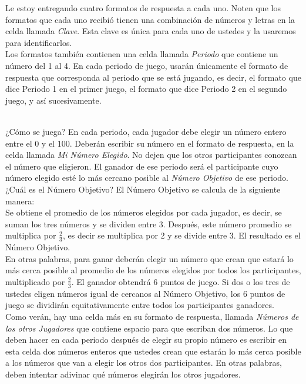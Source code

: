 Le estoy entregando cuatro formatos de respuesta a cada uno. Noten que los formatos que cada uno recibió tienen una combinación de números y letras en la celda llamada \textit{Clave}. Esta clave es única para cada uno de ustedes y la usaremos para identificarlos.\\

Los formatos también contienen una celda llamada \textit{Periodo} que contiene un número del 1 al 4. En cada periodo de juego, usarán únicamente el formato de respuesta que corresponda al periodo que se está jugando, es decir, el formato que dice Periodo 1 en el primer juego, el formato que dice Periodo 2 en el segundo juego, y así sucesivamente.\\\

¿Cómo se juega? En cada periodo, cada jugador debe elegir un número entero entre el 0 y el 100. Deberán escribir su número en el formato de respuesta, en la celda llamada \textit{Mi Número Elegido}. No dejen que los otros participantes conozcan el número que eligieron.
El ganador de ese periodo será el participante cuyo número elegido esté lo más cercano posible al \textit{Número Objetivo} de ese periodo. ¿Cuál es el Número Objetivo? El Número Objetivo se calcula de la siguiente manera:\\

Se obtiene el promedio de los números elegidos por cada jugador, es decir, se suman los tres números y se dividen entre 3. Después, este número promedio se multiplica por $\frac{2}{3}$, es decir se multiplica por 2 y se divide entre 3. El resultado es el Número Objetivo. \\

En otras palabras, para ganar deberán elegir un número que crean que estará lo más cerca posible al promedio de los números elegidos por todos los participantes, multiplicado por $\frac{2}{3}$. El ganador obtendrá 6 puntos de juego. Si dos o los tres de ustedes eligen números igual de cercanos al Número Objetivo, los 6 puntos de juego se dividirán equitativamente entre todos los participantes ganadores.\\

Como verán, hay una celda más en su formato de respuesta, llamada \textit{Números de los otros Jugadores} que contiene espacio para que escriban dos números. Lo que deben hacer en cada periodo después de elegir su propio número es escribir en esta celda dos números enteros que ustedes crean que estarán lo más cerca posible a los números que van a elegir los otros dos participantes. En otras palabras, deben intentar adivinar qué números elegirán los otros jugadores.\\


